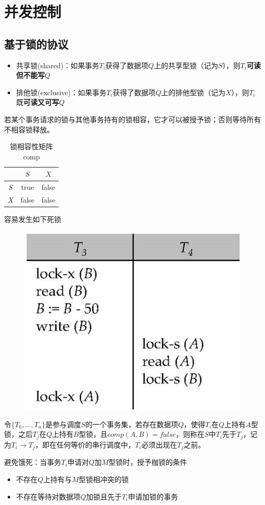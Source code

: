 
\section{并发控制} %
\subsection{基于锁的协议}
\begin{itemize}
	\item 共享锁(shared)：如果事务$T_i$获得了数据项$Q$上的共享型锁（记为$S$），则$T_i$\textbf{可读但不能写}$Q$
	\item 排他锁(exclusive)：如果事务$T_i$获得了数据项$Q$上的排他型锁（记为$X$），则$T_i$既\textbf{可读又可写}$Q$
\end{itemize}

若某个事务请求的锁与其他事务持有的锁相容，它才可以被授予锁；否则等待所有不相容锁释放。
\begin{table}
\centering
\caption{锁相容性矩阵comp}
\begin{tabular}{|c|c|c|}\hline
 & $S$ & $X$\\\hline
$S$ & true & false\\\hline
$X$ & false & false\\\hline
\end{tabular}
\end{table}

容易发生如下死锁
\begin{figure}[H]
\centering
\includegraphics[width=0.3\linewidth]{fig/deadlock.jpg}
\end{figure}

令$\{T_0,\ldots,T_n\}$是参与调度$S$的一个事务集，若存在数据项$Q$，使得$T_i$在$Q$上持有$A$型锁，之后$T_j$在$Q$上持有$B$型锁，且$comp(A,B)=false$，则称在$S$中$T_i$先于$T_j$，记为$T_i\to T_j$，即在任何等价的串行调度中，$T_i$必须出现在$T_j$之前。

避免饿死：当事务$T_i$申请对$Q$加$M$型锁时，授予枷锁的条件
\begin{itemize}
	\item 不存在$Q$上持有与$M$型锁相冲突的锁
	\item 不存在等待对数据项$Q$加锁且先于$T_i$申请加锁的事务
\end{itemize}

